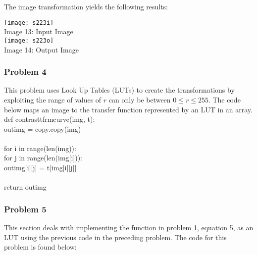 \documentclass{article}
\begin{document}
	The image transformation yields the following results: \\
	
	\begin{center}
		\noindent \texttt{[image: s223i]}\\
		Image 13: Input Image\\
		\texttt{[image: s223o]}\\
		Image 14: Output Image\\
	\end{center}
	
	\subsubsection{Problem 4}
	
	This problem uses Look Up Tables (LUTs) to create the transformations by exploiting the range of values of $ r $ can only be between $ 0 \leq r \leq 255 $. The code below maps an image to the transfer function represented by an LUT in an array. \\
	
	\noindent def contrast\textunderscore tfrm\textunderscore curve(img, t):\\
	\indent out\textunderscore img = copy.copy(img)\\
	\\
	\indent for i in range(len(img)):\\
	\indent \indent for j in range(len(img[i])):\\
	\indent \indent \indent out\textunderscore img[i][j] = t[img[i][j]]\\
	\\
	\indent return out\textunderscore img\\
	
	\subsubsection{Problem 5}
	
	This section deals with implementing the function in problem 1, equation 5, as an LUT using the previous code in the preceding problem. The code for this problem is found below: \\
	
\end{document}
